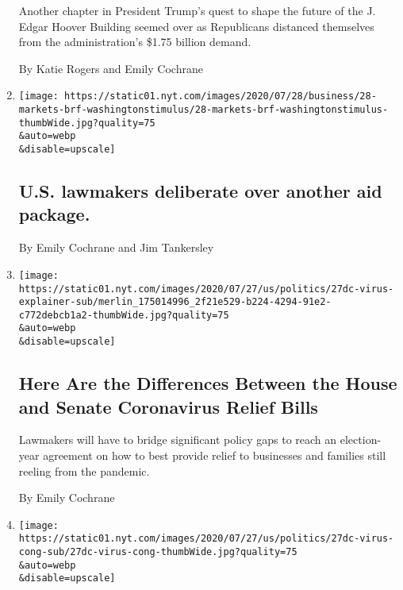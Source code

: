 \begin{enumerate}
  Another chapter in President Trump's quest to shape the future of the
  J. Edgar Hoover Building seemed over as Republicans distanced
  themselves from the administration's \$1.75 billion demand.

  By Katie Rogers and Emily Cochrane
\item
  \href{/2020/07/28/business/us-lawmakers-deliberate-over-another-aid-package.html}{}

  \texttt{[image: https://static01.nyt.com/images/2020/07/28/business/28-markets-brf-washingtonstimulus/28-markets-brf-washingtonstimulus-thumbWide.jpg?quality=75\\\&auto=webp\\\&disable=upscale]}

  \hypertarget{us-lawmakers-deliberate-over-another-aid-package}{%
  \subsection{U.S. lawmakers deliberate over another aid
  package.}\label{us-lawmakers-deliberate-over-another-aid-package}}

  By Emily Cochrane and Jim Tankersley
\item
  \href{/2020/07/28/us/politics/coronavirus-relief-bills-house-senate.html}{}

  \texttt{[image: https://static01.nyt.com/images/2020/07/27/us/politics/27dc-virus-explainer-sub/merlin\_175014996\_2f21e529-b224-4294-91e2-c772debcb1a2-thumbWide.jpg?quality=75\\\&auto=webp\\\&disable=upscale]}

  \hypertarget{here-are-the-differences-between-the-house-and-senate-coronavirus-relief-bills}{%
  \subsection{Here Are the Differences Between the House and Senate
  Coronavirus Relief
  Bills}\label{here-are-the-differences-between-the-house-and-senate-coronavirus-relief-bills}}

  Lawmakers will have to bridge significant policy gaps to reach an
  election-year agreement on how to best provide relief to businesses
  and families still reeling from the pandemic.

  By Emily Cochrane
\item
  \href{/2020/07/27/us/politics/republicans-jobless-aid.html}{}

  \texttt{[image: https://static01.nyt.com/images/2020/07/27/us/politics/27dc-virus-cong-sub/27dc-virus-cong-thumbWide.jpg?quality=75\\\&auto=webp\\\&disable=upscale]}


\end{enumerate}
